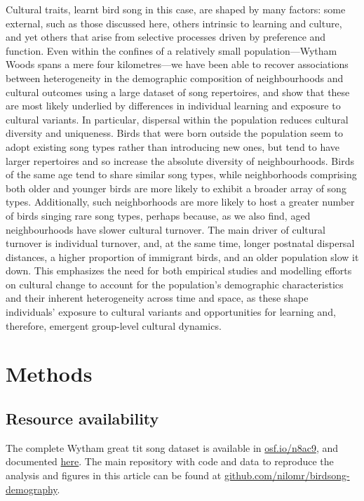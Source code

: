 Cultural traits, learnt bird song in this case, are shaped by many factors: some external, such as those discussed here, others intrinsic to learning and culture, and yet others that arise from selective processes driven by preference and function. Even within the confines of a relatively small population---Wytham Woods spans a mere four kilometres---we have been able to recover associations between heterogeneity in the demographic composition of neighbourhoods and cultural outcomes using a large dataset of song repertoires, and show that these are most likely underlied by differences in individual learning and exposure to cultural variants. 
In particular, dispersal within the population reduces cultural diversity and uniqueness. Birds that were born outside the population seem to adopt existing song types rather than introducing new ones, but tend to have larger repertoires and so increase the absolute diversity of neighbourhoods. Birds of the same age tend to share similar song types, while neighborhoods comprising both older and younger birds are more likely to exhibit a broader array of song types. Additionally, such neighborhoods are more likely to host a greater number of birds singing rare song types, perhaps because, as we also find, aged neighbourhoods have slower cultural turnover. The main driver of cultural turnover is individual turnover, and, at the same time, longer postnatal dispersal distances, a higher proportion of immigrant birds, and an older population slow it down. This emphasizes the need for both empirical studies and modelling efforts on cultural change to account for the population's demographic characteristics and their inherent heterogeneity across time and space, as these shape individuals' exposure to cultural variants and opportunities for learning and, therefore, emergent group-level cultural dynamics.

\section{Methods}
\label{sc:methods}

\subsection{Resource availability}

The complete Wytham great tit song dataset is available in \href{https://osf.io/n8ac9}{osf.io/n8ac9}, and documented \href{https://nilomr.github.io/great-tit-hits/}{here}. The main repository with code and data to reproduce the analysis and figures in this article can be found at \href{http://github.com/nilomr/birdsong-demography}{github.com/nilomr/birdsong-demography}.

